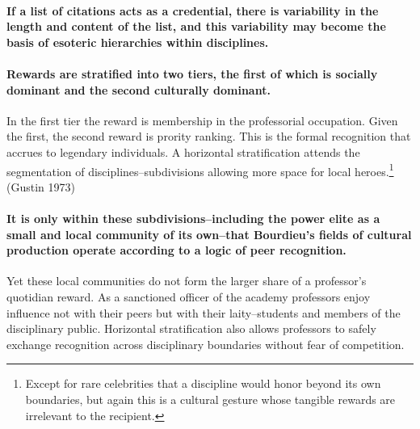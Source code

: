 \documentclass[]{article}
\let\rmarkdownfootnote\footnote%
\def\footnote{\protect\rmarkdownfootnote}
\begin{document}
\paragraph{If a list of citations acts as a credential, there is
variability in the length and content of the list, and this variability
may become the basis of esoteric hierarchies within
disciplines.}\label{if-a-list-of-citations-acts-as-a-credential-there-is-variability-in-the-length-and-content-of-the-list-and-this-variability-may-become-the-basis-of-esoteric-hierarchies-within-disciplines.}

\paragraph{Rewards are stratified into two tiers, the first of which is
socially dominant and the second culturally
dominant.}\label{rewards-are-stratified-into-two-tiers-the-first-of-which-is-socially-dominant-and-the-second-culturally-dominant.}

In the first tier the reward is membership in the professorial
occupation. Given the first, the second reward is prority ranking. This
is the formal recognition that accrues to legendary individuals. A
horizontal stratification attends the segmentation of
disciplines--subdivisions allowing more space for local
heroes.\footnote{Except for rare celebrities that a discipline would
  honor beyond its own boundaries, but again this is a cultural gesture
  whose tangible rewards are irrelevant to the recipient.} (Gustin 1973)

\paragraph{It is only within these subdivisions--including the power
elite as a small and local community of its own--that Bourdieu's fields
of cultural production operate according to a logic of peer
recognition.}\label{it-is-only-within-these-subdivisionsincluding-the-power-elite-as-a-small-and-local-community-of-its-ownthat-bourdieus-fields-of-cultural-production-operate-according-to-a-logic-of-peer-recognition.}

Yet these local communities do not form the larger share of a
professor's quotidian reward. As a sanctioned officer of the academy
professors enjoy influence not with their peers but with their
laity--students and members of the disciplinary public. Horizontal
stratification also allows professors to safely exchange recognition
across disciplinary boundaries without fear of competition.
\end{document}
